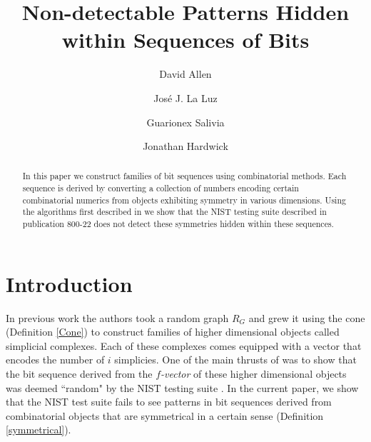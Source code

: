 \documentclass[oneside,12pt]{amsart}
\theoremstyle{definition}
\numberwithin{equation}{section}
\begin{document}
\title{Non-detectable Patterns Hidden within Sequences of Bits}

\author[D. Allen]{David Allen}
\address{Department of Mathematics BMCC, CUNY, New York, New York 10007}

\author[J. J. La Luz]{Jos\'{e} J. La Luz}
\address{Departmento de Matem\'aticas, Universidad de Puerto Rico,
\newline Industrial Minillas 170 Car 174, Bayam\'on, PR, 00959-1919}

\author[G. Salivia]{Guarionex Salivia}
\address{Department of Mathematics, Computer Science and Statistics, \newline Gustavus Adolphus College, 800 West College Avenue
Saint Peter, MN 56082}

\author[J. Hardwick]{Jonathan Hardwick}
\address{Department of Computer Science, Minnesota state University, \newline Mankato,
South Rd and Ellis Ave, Mankato, MN 56001}


\begin{abstract}
In this paper we construct families of bit sequences using combinatorial methods.  Each sequence is derived by converting a collection of numbers encoding certain combinatorial numerics from objects exhibiting symmetry in various dimensions.  Using the algorithms first described in \cite{ALDH} we show that the NIST testing suite described in publication 800-22 does not detect these symmetries hidden within these sequences.

\end{abstract}

\maketitle

\section{Introduction}

In previous work \cite{ALDH} the authors took a random graph $R_G$ and grew it using the cone (Definition \ref{Cone}) to construct families of higher dimensional objects called simplicial complexes.  Each of these complexes comes equipped with a vector that encodes the number of $i$ simplicies.  One of the main thrusts of \cite{ALDH} was to show that the bit sequence derived from the \textit{$f$-vector} of these higher dimensional objects was deemed ``random" by the NIST testing suite \cite{NIST}.  In the current paper, we show that the NIST test suite fails to see patterns in bit sequences derived from combinatorial objects that are symmetrical in a certain sense (Definition \ref{symmetrical}).
\end{document}
